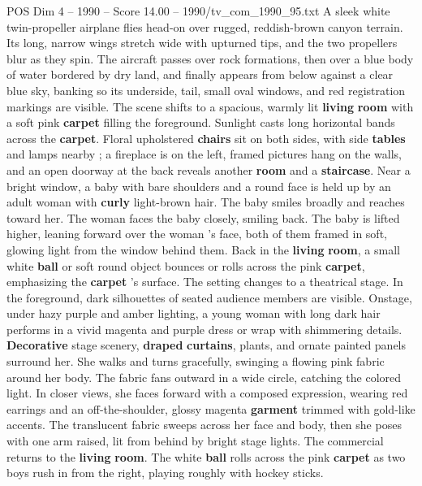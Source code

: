 \begin{textsample}{POS Dim 4 – 1990 – Score 14.00 – 1990/tv\_com\_1990\_95.txt}  \label{ex:f4_pos_074}
A sleek white twin-propeller airplane flies head-on over rugged, reddish-brown canyon terrain.
Its long, narrow wings stretch wide with upturned tips, and the two propellers blur as they spin.
The aircraft passes over rock formations, then over a blue body of water bordered by dry land, and finally appears from below against a clear blue sky, banking so its underside, tail, small oval windows, and red registration markings are visible.
The scene shifts to a spacious, warmly lit \textbf{living} \textbf{room} with a soft pink \textbf{carpet} filling the foreground.
Sunlight casts long horizontal bands across the \textbf{carpet}.
Floral upholstered \textbf{chairs} sit on both sides, with side \textbf{tables} and lamps nearby ; a fireplace is on the left, framed pictures hang on the walls, and an open doorway at the back reveals another \textbf{room} and a \textbf{staircase}.
Near a bright window, a baby with bare shoulders and a round face is held up by an adult woman with \textbf{curly} light-brown hair.
The baby smiles broadly and reaches toward her.
The woman faces the baby closely, smiling back.
The baby is lifted higher, leaning forward over the woman ’s face, both of them framed in soft, glowing light from the window behind them.
Back in the \textbf{living} \textbf{room}, a small white \textbf{ball} or soft round object bounces or rolls across the pink \textbf{carpet}, emphasizing the \textbf{carpet} ’s surface.
The setting changes to a theatrical stage.
In the foreground, dark silhouettes of seated audience members are visible.
Onstage, under hazy purple and amber lighting, a young woman with long dark hair performs in a vivid magenta and purple dress or wrap with shimmering details. \textbf{Decorative} stage scenery, \textbf{draped} \textbf{curtains}, plants, and ornate painted panels surround her.
She walks and turns gracefully, swinging a flowing pink fabric around her body.
The fabric fans outward in a wide circle, catching the colored light.
In closer views, she faces forward with a composed expression, wearing red earrings and an off-the-shoulder, glossy magenta \textbf{garment} trimmed with gold-like accents.
The translucent fabric sweeps across her face and body, then she poses with one arm raised, lit from behind by bright stage lights.
The commercial returns to the \textbf{living} \textbf{room}.
The white \textbf{ball} rolls across the pink \textbf{carpet} as two boys rush in from the right, playing roughly with hockey sticks.

\end{textsample}
